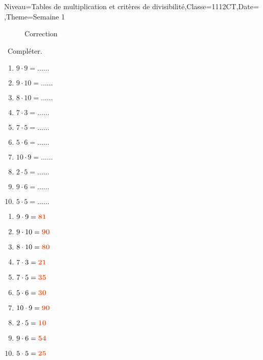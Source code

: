 \documentclass[a4paper,11pt,fleqn]{article}
\begin{document}
\begin{Maquette}[Fiche, CorrigeApres=false, CorrigeFin=true]{Niveau=Tables de multiplication et critères de divisibilité,Classe=1112CT,Date=   ,Theme=Semaine 1}

\begin{exercice}
\begin{wrapfigure}{r}{2cm}
\centering
{\hypersetup{urlcolor=black}
}
Correction
\end{wrapfigure}\ 
Compléter.	
	\begin{enumerate}[itemsep=2em]
	\item $ 9\cdot 9 =\ldots\ldots$
	\item $ 9\cdot 10 =\ldots\ldots$
	\item $ 8\cdot 10 =\ldots\ldots$
	\item $ 7\cdot 3 =\ldots\ldots$
	\item $ 7\cdot 5 =\ldots\ldots$
	\item $ 5\cdot 6 =\ldots\ldots$
	\item $ 10\cdot 9 =\ldots\ldots$
	\item $ 2\cdot 5 =\ldots\ldots$
	\item $ 9\cdot 6 =\ldots\ldots$
	\item $ 5\cdot 5 =\ldots\ldots$
\end{enumerate}
\end{exercice}

\begin{Solution}
\begin{enumerate}[itemsep=1em]
	\item $ 9\cdot 9 = {\color[HTML]{f15929}\boldsymbol{81}}$
	\item $ 9\cdot 10 = {\color[HTML]{f15929}\boldsymbol{90}}$
	\item $ 8\cdot 10 = {\color[HTML]{f15929}\boldsymbol{80}}$
	\item $ 7\cdot 3 = {\color[HTML]{f15929}\boldsymbol{21}}$
	\item $ 7\cdot 5 = {\color[HTML]{f15929}\boldsymbol{35}}$
	\item $ 5\cdot 6 = {\color[HTML]{f15929}\boldsymbol{30}}$
	\item $ 10\cdot 9 = {\color[HTML]{f15929}\boldsymbol{90}}$
	\item $ 2\cdot 5 = {\color[HTML]{f15929}\boldsymbol{10}}$
	\item $ 9\cdot 6 = {\color[HTML]{f15929}\boldsymbol{54}}$
	\item $ 5\cdot 5 = {\color[HTML]{f15929}\boldsymbol{25}}$
\end{enumerate}
\end{Solution}


\end{Maquette}
\end{document}
